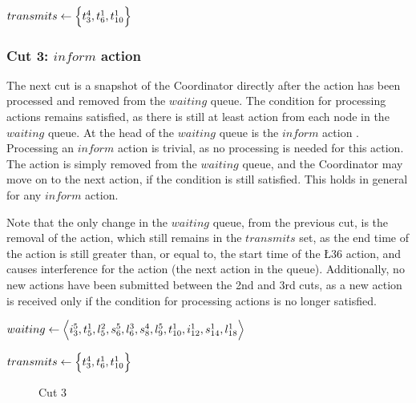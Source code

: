 $transmits \leftarrow \Big\{ t^{4}_{3}, t^{1}_{6}, t^{1}_{10} \Big\}$

\subsubsection{Cut 3: $inform$ action}
The next cut is a snapshot of the Coordinator directly after the  action has been processed and removed from the $waiting$ queue. The condition for processing actions remains satisfied, as there is still at least action from each node in the $waiting$ queue. At the head of the $waiting$ queue is the $inform$ action . Processing an $inform$ action is trivial, as no processing is needed for this action. The action is simply removed from the $waiting$ queue, and the Coordinator may move on to the next action, if the condition is still satisfied. This holds in general for any $inform$ action. \smallbreak

Note that the only change in the $waiting$ queue, from the previous cut, is the removal of the  action, which still remains in the $transmits$ set, as the end time of the  action is still greater than, or equal to, the start time of the \L{3}{6} action, and causes interference for the  action (the next action in the queue). Additionally, no new actions have been submitted between the 2nd and 3rd cuts, as a new action is received only if the condition for processing actions is no longer satisfied. \medbreak

$waiting \leftarrow \Big\langle%
    \I{5}{3}, %
    \T{1}{5}, %
    \L{2}{5}, %
    \S{5}{6}, %
    \L{3}{6}, %
    \S{4}{8}, %
    \L{5}{9}, %
    \T{1}{10}, %
    \I{1}{12}, %
    \S{1}{14}, %
    \L{1}{18} %
    \Big\rangle$

$transmits \leftarrow \Big\{ t^{4}_{3}, t^{1}_{6}, t^{1}_{10} \Big\}$

\begin{figure}[H]
    \centering

    \caption{Cut 3}\label{tikz:coordinatormsc3}
\end{figure}


